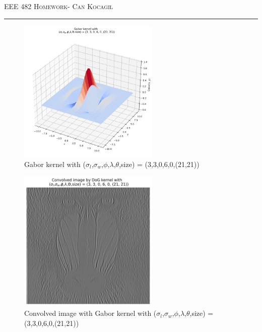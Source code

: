 \documentclass[12pt]{amsart}
\begin{document}
\newpage
{\scshape EEE 482} \hfill {\scshape \large  Homework-\relax} \hfill {\scshape Can Kocagil}
\smallskip
\hrule
\vspace{2mm}


\begin{figure}[ht]
    \centering
    \includegraphics[width = 0.6\textwidth]{images/Gabor_0_3d.png}
    \caption{Gabor kernel with ($\sigma_l$,$\sigma_w$,$\phi$,$\lambda$,$\theta$,size) = (3,3,0,6,0,(21,21))}
\end{figure}





\begin{figure}[ht]
    \centering
    \includegraphics[width = 0.6\textwidth]{images/Gabor_conv_0.png}
    \caption{Convolved image with Gabor kernel with ($\sigma_l$,$\sigma_w$,$\phi$,$\lambda$,$\theta$,size) = (3,3,0,6,0,(21,21))}
\end{figure}
\end{document}
